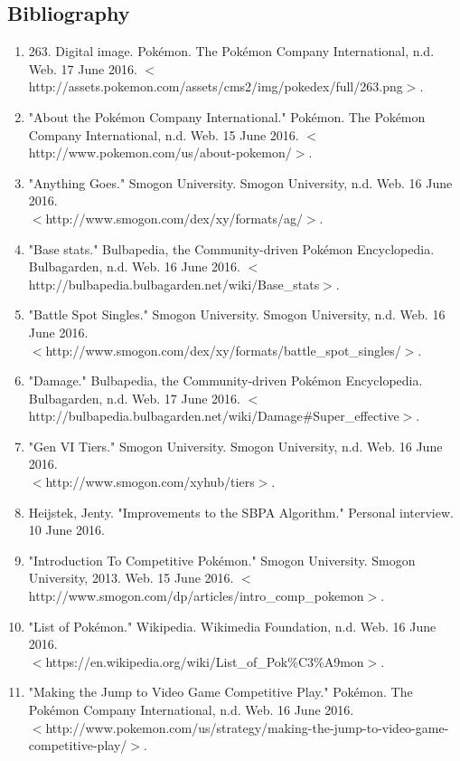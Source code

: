 \documentclass{article}
\begin{document}
\subsection{Bibliography}
\begin{enumerate}
	\item 263. Digital image. Pok\'emon. The Pok\'emon Company International, n.d. Web. 17 June 2016. $<$http://assets.pokemon.com/assets/cms2/img/pokedex/full/263.png$>$.  
	\item "About the Pokémon Company International." Pok\'emon. The Pok\'emon Company International, n.d. Web. 15 June 2016. $<$http://www.pokemon.com/us/about-pokemon/$>$.
	\item "Anything Goes." Smogon University. Smogon University, n.d. Web. 16 June 2016. \\$<$http://www.smogon.com/dex/xy/formats/ag/$>$. 
	\item "Base stats." Bulbapedia, the Community-driven Pokémon Encyclopedia. Bulbagarden, n.d. Web. 16 June 2016. $<$http://bulbapedia.bulbagarden.net/wiki/Base\_stats$>$.
	\item "Battle Spot Singles." Smogon University. Smogon University, n.d. Web. 16 June 2016. \\$<$http://www.smogon.com/dex/xy/formats/battle\_spot\_singles/$>$.
	\item "Damage." Bulbapedia, the Community-driven Pokémon Encyclopedia. Bulbagarden, n.d. Web. 17 June 2016. $<$http://bulbapedia.bulbagarden.net/wiki/Damage\#Super\_effective$>$. 
	\item "Gen VI Tiers." Smogon University. Smogon University, n.d. Web. 16 June 2016. \\$<$http://www.smogon.com/xyhub/tiers$>$. 
	\item  Heijstek, Jenty. "Improvements to the SBPA Algorithm." Personal interview. 10 June 2016.  
	\item"Introduction To Competitive Pok\'emon." Smogon University. Smogon University, 2013. Web. 15 June 2016. $<$http://www.smogon.com/dp/articles/intro\_comp\_pokemon$>$.
	\item "List of Pokémon." Wikipedia. Wikimedia Foundation, n.d. Web. 16 June 2016. \\$<$https://en.wikipedia.org/wiki/List\_of\_Pok\%C3\%A9mon$>$.
	\item "Making the Jump to Video Game Competitive Play." Pok\'emon. The Pok\'emon Company International, n.d. Web. 16 June 2016. \\$<$http://www.pokemon.com/us/strategy/making-the-jump-to-video-game-competitive-play/$>$.  

\end{enumerate}
\end{document}
